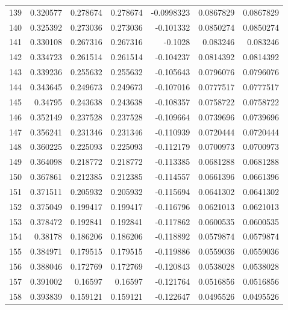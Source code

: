 \begin{tabular}{rrrrrrr}
 139 &  0.320577    & 0.278674    & 0.278674    & -0.0998323   & 0.0867829   & 0.0867829   \\
 140 &  0.325392    & 0.273036    & 0.273036    & -0.101332    & 0.0850274   & 0.0850274   \\
 141 &  0.330108    & 0.267316    & 0.267316    & -0.1028      & 0.083246    & 0.083246    \\
 142 &  0.334723    & 0.261514    & 0.261514    & -0.104237    & 0.0814392   & 0.0814392   \\
 143 &  0.339236    & 0.255632    & 0.255632    & -0.105643    & 0.0796076   & 0.0796076   \\
 144 &  0.343645    & 0.249673    & 0.249673    & -0.107016    & 0.0777517   & 0.0777517   \\
 145 &  0.34795     & 0.243638    & 0.243638    & -0.108357    & 0.0758722   & 0.0758722   \\
 146 &  0.352149    & 0.237528    & 0.237528    & -0.109664    & 0.0739696   & 0.0739696   \\
 147 &  0.356241    & 0.231346    & 0.231346    & -0.110939    & 0.0720444   & 0.0720444   \\
 148 &  0.360225    & 0.225093    & 0.225093    & -0.112179    & 0.0700973   & 0.0700973   \\
 149 &  0.364098    & 0.218772    & 0.218772    & -0.113385    & 0.0681288   & 0.0681288   \\
 150 &  0.367861    & 0.212385    & 0.212385    & -0.114557    & 0.0661396   & 0.0661396   \\
 151 &  0.371511    & 0.205932    & 0.205932    & -0.115694    & 0.0641302   & 0.0641302   \\
 152 &  0.375049    & 0.199417    & 0.199417    & -0.116796    & 0.0621013   & 0.0621013   \\
 153 &  0.378472    & 0.192841    & 0.192841    & -0.117862    & 0.0600535   & 0.0600535   \\
 154 &  0.38178     & 0.186206    & 0.186206    & -0.118892    & 0.0579874   & 0.0579874   \\
 155 &  0.384971    & 0.179515    & 0.179515    & -0.119886    & 0.0559036   & 0.0559036   \\
 156 &  0.388046    & 0.172769    & 0.172769    & -0.120843    & 0.0538028   & 0.0538028   \\
 157 &  0.391002    & 0.16597     & 0.16597     & -0.121764    & 0.0516856   & 0.0516856   \\
 158 &  0.393839    & 0.159121    & 0.159121    & -0.122647    & 0.0495526   & 0.0495526   \\

\end{tabular}

